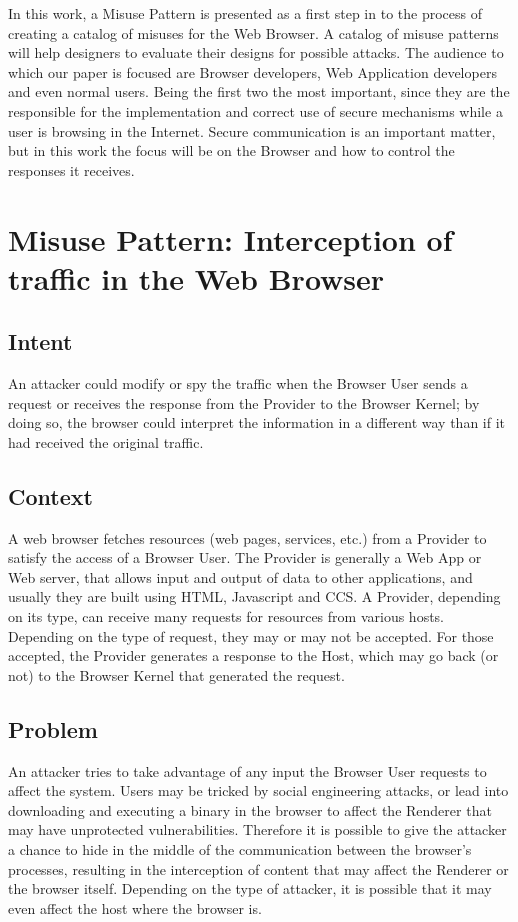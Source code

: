 \documentclass{sig-alternate-05-2015}
\begin{document}
In this work, a Misuse Pattern is presented as a first step in to the process of creating a catalog of misuses for the Web Browser. A catalog of misuse patterns will help designers to evaluate their designs for possible attacks. The audience to which our paper is focused are Browser developers, Web Application developers and even normal users. Being the first two the most important, since they are the responsible for the implementation and correct use of secure mechanisms while a user is browsing in the Internet. Secure communication is an important matter, but in this work the focus will be on the Browser and how to control the responses it receives.


\section{Misuse Pattern: Interception of traffic in the Web Browser}
\subsection*{Intent}
An attacker could modify or spy the traffic when the Browser User sends a request or receives the response from the Provider to the Browser Kernel; by doing so, the browser could interpret the information in a different way than if it had received the original traffic.

\subsection*{Context}
A web browser fetches resources (web pages, services, etc.) from a Provider to satisfy the access of a Browser User. The Provider is generally a Web App or Web server, that allows input and output of data to other applications, and usually they are built using HTML, Javascript and CCS. A Provider, depending on its type, can receive many requests for resources from various hosts. Depending on the type of request, they may or may not be accepted. For those accepted, the Provider generates a response to the Host, which may go back (or not) to the Browser Kernel that generated the request.

\subsection*{Problem}
An attacker tries to take advantage of any input the Browser User requests to affect the system. Users may be tricked by social engineering attacks, or lead into downloading and executing a binary in the browser to affect the Renderer that may have unprotected vulnerabilities. Therefore it is possible to give the attacker a chance to hide in the middle of the communication between the browser's processes, resulting in the interception of content that may affect the Renderer or the browser itself. Depending on the type of attacker, it is possible that it may even affect the host where the browser is.
\end{document}
